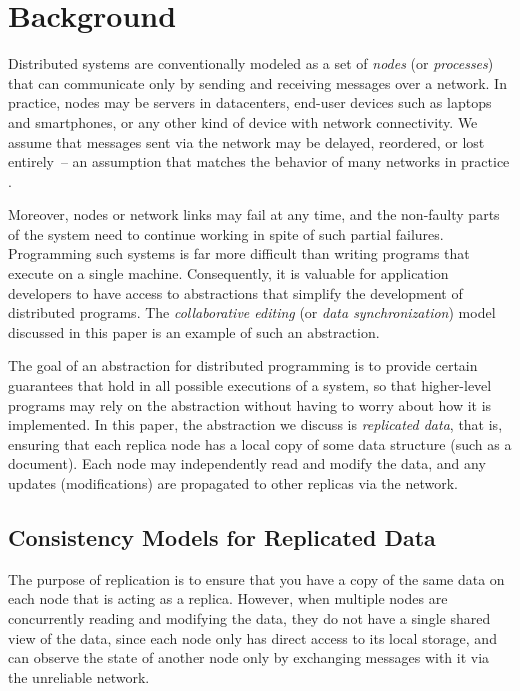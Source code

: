 \section{Background}
\label{sect.background}

Distributed systems are conventionally modeled as a set of \emph{nodes} (or \emph{processes}) that
can communicate only by sending and receiving messages over a network. In practice, nodes may be
servers in datacenters, end-user devices such as laptops and smartphones, or any other kind of
device with network connectivity. We assume that messages sent via the network may be delayed,
reordered, or lost entirely~-- an assumption that matches the behavior of many networks in practice
\cite{Bailis:2014jx}.

Moreover, nodes or network links may fail at any time, and the non-faulty parts of the system need
to continue working in spite of such partial failures. Programming such systems is far more
difficult than writing programs that execute on a single machine. Consequently, it is valuable for
application developers to have access to abstractions that simplify the development of distributed
programs. The \emph{collaborative editing} (or \emph{data synchronization}) model discussed in this
paper is an example of such an abstraction.

The goal of an abstraction for distributed programming is to provide certain guarantees that hold in
all possible executions of a system, so that higher-level programs may rely on the abstraction
without having to worry about how it is implemented. In this paper, the abstraction we discuss is
\emph{replicated data}, that is, ensuring that each replica node has a local copy of some data
structure (such as a document). Each node may independently read and modify the data, and any
updates (modifications) are propagated to other replicas via the network.

\subsection{Consistency Models for Replicated Data}\label{sect.consistencymodels}

The purpose of replication is to ensure that you have a copy of the same data on each node that is
acting as a replica. However, when multiple nodes are concurrently reading and modifying the data,
they do not have a single shared view of the data, since each node only has direct access to its
local storage, and can observe the state of another node only by exchanging messages with it via the
unreliable network.

